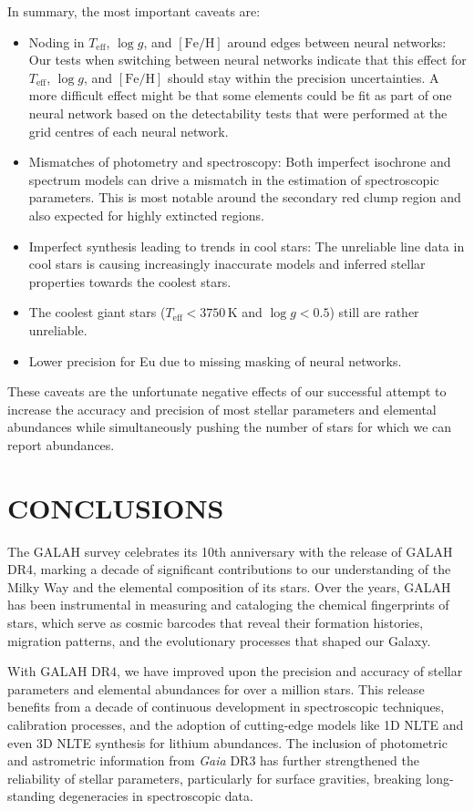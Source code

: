 \documentclass[
  journal=pasa,
  manuscript=research-paper, %
  year=2024,
  volume=37
]{cup-journal}
\newcommand{\Teff}{$T_\mathrm{eff}$\xspace}
\newcommand{\logg}{$\log g$\xspace}
\newcommand{\feh}{$\mathrm{[Fe/H]}$\xspace}
\newcommand{\Gaia}{\textit{Gaia}\xspace}
\newcommand{\TLF}{\Teff, \logg, and \feh}
\begin{document}
In summary, the most important caveats are:
\begin{itemize}
    \item Noding in \TLF around edges between neural networks: Our tests when switching between neural networks indicate that this effect for \TLF should stay within the precision uncertainties. A more difficult effect might be that some elements could be fit as part of one neural network based on the detectability tests that were performed at the grid centres of each neural network.
    \item Mismatches of photometry and spectroscopy: Both imperfect isochrone and spectrum models can drive a mismatch in the estimation of spectroscopic parameters. This is most notable around the secondary red clump region and also expected for highly extincted regions.
    \item Imperfect synthesis leading to trends in cool stars: The unreliable line data in cool stars is causing increasingly inaccurate models and inferred stellar properties towards the coolest stars.
    \item The coolest giant stars ($T_\mathrm{eff} < 3750\,\mathrm{K}$ and $\log g < 0.5$) still are rather unreliable.
    \item Lower precision for Eu due to missing masking of neural networks.
\end{itemize}

These caveats are the unfortunate negative effects of our successful attempt to increase the accuracy and precision of most stellar parameters and elemental abundances while simultaneously pushing the number of stars for which we can report abundances.

\section{CONCLUSIONS}
\label{sec:conclusion}

The GALAH survey celebrates its 10th anniversary with the release of GALAH DR4, marking a decade of significant contributions to our understanding of the Milky Way and the elemental composition of its stars. Over the years, GALAH has been instrumental in measuring and cataloging the chemical fingerprints of stars, which serve as cosmic barcodes that reveal their formation histories, migration patterns, and the evolutionary processes that shaped our Galaxy.

With GALAH DR4, we have improved upon the precision and accuracy of stellar parameters and elemental abundances for over a million stars. This release benefits from a decade of continuous development in spectroscopic techniques, calibration processes, and the adoption of cutting-edge models like 1D NLTE and even 3D NLTE synthesis for lithium abundances. The inclusion of photometric and astrometric information from \Gaia DR3 has further strengthened the reliability of stellar parameters, particularly for surface gravities, breaking long-standing degeneracies in spectroscopic data.
\end{document}
